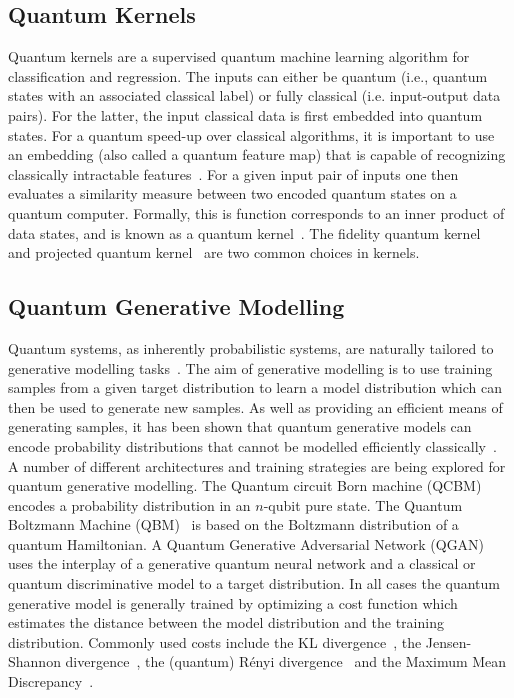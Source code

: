 \subsection{Quantum Kernels}

Quantum kernels are a supervised quantum machine learning algorithm for classification and regression. The inputs can either be quantum (i.e., quantum states with an associated classical label) or fully classical (i.e. input-output data pairs). For the latter, the input classical data is first embedded into quantum states. For a quantum speed-up over classical algorithms, it is important to use an embedding (also called a quantum feature map) that is capable of recognizing classically intractable features~\cite{huang2021power,kubler2021inductive,liu2021rigorous}.
For a given input pair of inputs one then evaluates a similarity measure between two encoded quantum states on a quantum computer. Formally, this is function corresponds to an inner product of data states, and is known as a quantum kernel~\cite{schuld2021supervised,havlivcek2019supervised, huang2021power}. The fidelity quantum kernel~\cite{schuld2021supervised,havlivcek2019supervised} and projected quantum kernel~\cite{huang2021power} are two common choices in kernels.

\subsection{Quantum Generative Modelling}

Quantum systems, as inherently probabilistic systems, are naturally tailored to generative modelling tasks~\cite{PerdomoOrtiz2017}. The aim of generative modelling is to use training samples from a given target distribution to learn a model distribution which can then be used to generate new samples. As well as providing an efficient means of generating samples, it has been shown that quantum generative models can encode probability distributions that cannot be modelled efficiently classically~\cite{Coyle2019, sweke2020learnability, gao2021enhancing}. A number of different architectures and training strategies are being explored for quantum generative modelling. 
The Quantum circuit Born machine (QCBM)~\cite{benedetti2019generative} encodes a probability distribution in an $n$-qubit pure state. The Quantum Boltzmann Machine (QBM)~\cite{QBM_amin} is based on the Boltzmann distribution of a quantum Hamiltonian. A Quantum Generative Adversarial Network (QGAN)~\cite{QGAN_Loyd} uses the interplay of a generative quantum neural network and a classical or quantum discriminative model to a target distribution. 
In all cases the quantum generative model is generally trained by optimizing a cost function which estimates the distance between the model distribution and the training distribution. Commonly used costs include the KL divergence~\cite{kullback1951KLD}, the Jensen-Shannon divergence~\cite{lin1991divergence}, the (quantum) Rényi divergence~\cite{renyi1961measures, kieferova2021quantum} and the Maximum Mean Discrepancy~\cite{Gretton2012mmd}. 


